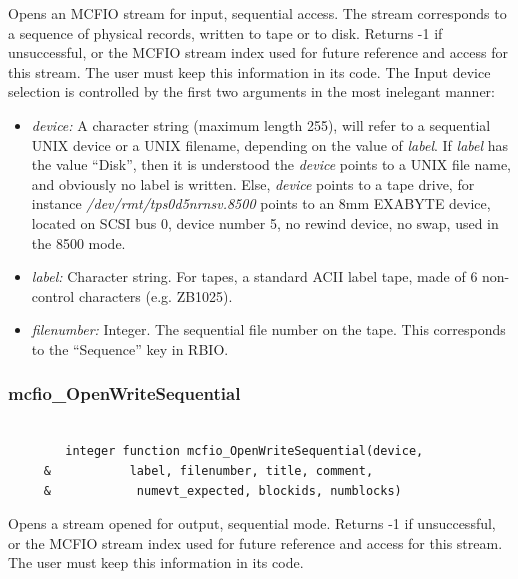  Opens an MCFIO stream for input, sequential access. The stream corresponds
 to a sequence of physical records, written to tape or to disk. Returns -1
 if unsuccessful, or the MCFIO stream index
 used for future reference and access for this stream. The user must keep
 this information in its code.
 The Input device selection is controlled by the first two arguments
 in the most inelegant manner:
\begin{itemize}

\item {\em device:} A  character
 string (maximum length 255), will refer to a  sequential UNIX device or a
 UNIX filename, depending on the value of {\em label}.  If {\em label} has
 the value ``Disk'', then it is understood the {\em device} points to
 a UNIX file name, and obviously no label is written. Else, {\em device} points
 to a tape drive, for instance {\em /dev/rmt/tps0d5nrnsv.8500} points to
 an 8mm EXABYTE device, located on SCSI bus 0, device number 5, no rewind
 device, no swap, used in the 8500 mode.
\item {\em label:} Character string. For tapes, a standard ACII label tape,
made of 6 non-control characters (e.g. ZB1025).
\item {\em filenumber:} Integer. The sequential file number on the
tape. This corresponds to the ``Sequence'' key in RBIO.
\end{itemize}


\subsubsection{mcfio\_OpenWriteSequential}

\begin{verbatim}

        integer function mcfio_OpenWriteSequential(device,
     &           label, filenumber, title, comment,
     &            numevt_expected, blockids, numblocks)
\end{verbatim}

	Opens a stream opened for output, sequential mode. Returns -1
 if unsuccessful, or the MCFIO stream index
 used for future reference and access for this stream. The user must keep
 this information in its code.

